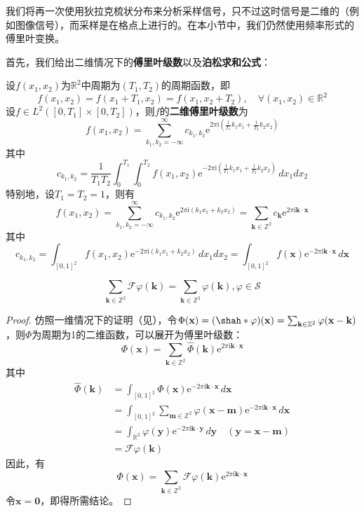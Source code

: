我们将再一次使用狄拉克梳状分布来分析采样信号，只不过这时信号是二维的（例如图像信号），而采样是在格点上进行的。在本小节中，我们仍然使用频率形式的傅里叶变换。

首先，我们给出二维情况下的\textbf{傅里叶级数}以及\textbf{泊松求和公式}：
\begin{definition}[二维傅里叶级数]
    设$f(x_1,x_2)$为$\mathbb{R}^2$中周期为$(T_1,T_2)$的周期函数，即
    \[f(x_1,x_2)=f(x_1+T_1,x_2)=f(x_1,x_2+T_2),\quad \forall (x_1,x_2)\in\mathbb{R}^2\]
    设$f\in L^2([0,T_1]\times[0,T_2])$，则$f$的\textbf{二维傅里叶级数}为
    \[f(x_1,x_2)=\sum_{k_1,k_2=-\infty}^{\infty}c_{k_1,k_2}\mathrm{e}^{2\pi \mathrm{i}\left(\frac{1}{T_1}k_1 x_1+\frac{1}{T_2}k_2 x_2\right)}\]
    其中
    \[c_{k_1,k_2}=\frac{1}{T_1 T_2}\int_0^{T_1}\int_0^{T_2}f(x_1,x_2)\mathrm{e}^{-2\pi \mathrm{i}\left(\frac{1}{T_1}k_1 x_1+\frac{1}{T_2}k_2 x_2\right)}\,dx_1 dx_2\]
    特别地，设$T_1=T_2=1$，则有
    \[f(x_1,x_2)=\sum_{k_1,k_2=-\infty}^{\infty}c_{k_1,k_2}\mathrm{e}^{2\pi \mathrm{i}(k_1 x_1+k_2 x_2)}=\sum_{\mathbf{k}\in\mathbb{Z}^2}c_{\mathbf{k}}\mathrm{e}^{2\pi \mathrm{i}\mathbf{k\cdot x}}\]
    其中
    \[c_{k_1,k_2}=\int_{[0,1]^2}f(x_1,x_2)\mathrm{e}^{-2\pi \mathrm{i}(k_1 x_1+k_2 x_2)}\,dx_1 dx_2=\int_{[0,1]^2}f(\mathbf{x})\mathrm{e}^{-2\pi \mathrm{i} \mathbf{k}\cdot \mathbf{x}}\,d\mathbf{x}\]
\end{definition}
\begin{theorem}[二维泊松求和公式]
    \[\sum_{\mathbf{k}\in\mathbb{Z}^2}\mathcal{F} \varphi(\mathbf{k})=\sum_{\mathbf{k}\in\mathbb{Z}^2}\varphi(\mathbf{k}),\varphi\in\mathcal{S} \]
\end{theorem}
\begin{proof}
    仿照一维情况下的证明（见），令$\Phi(\mathbf{x})=(\shah *\varphi)(\mathbf{x})=\sum_{\mathbf{k}\in\mathbb{Z}^2}\varphi(\mathbf{x}-\mathbf{k})$，则$\Phi$为周期为1的二维函数，可以展开为傅里叶级数：
    \[\Phi(\mathbf{x})=\sum_{\mathbf{k}\in\mathbb{Z}^2}\hat{\Phi}(\mathbf{k})\mathrm{e}^{2\pi \mathrm{i} \mathbf{k}\cdot \mathbf{x}}\]
    其中\begin{align*}
        \hat{\Phi}(\mathbf{k})&=\int_{[0,1]^2}\Phi(\mathbf{x})\mathrm{e}^{-2\pi \mathrm{i}\mathbf{k}\cdot \mathbf{x}}\,d\mathbf{x}\\
        &=\int_{[0,1]^2}\sum_{\mathbf{m}\in\mathbb{Z}^2}\varphi(\mathbf{x}-\mathbf{m})\mathrm{e}^{-2\pi \mathrm{i}\mathbf{k}\cdot \mathbf{x}}\,d\mathbf{x}\\
        &=\int_{\mathbb{R}^2}\varphi(\mathbf{y})\mathrm{e}^{-2\pi \mathrm{i}\mathbf{k}\cdot \mathbf{y}}\,d\mathbf{y}\quad (\mathbf{y}=\mathbf{x}-\mathbf{m})\\
        &=\mathcal{F} \varphi(\mathbf{k})
    \end{align*}
    因此，有
    \[\Phi(\mathbf{x})=\sum_{\mathbf{k}\in\mathbb{Z}^2}\mathcal{F} \varphi(\mathbf{k})\mathrm{e}^{2\pi \mathrm{i} \mathbf{k}\cdot \mathbf{x}}\]
    令$\mathbf{x}=\mathbf{0}$，即得所需结论。
\end{proof}

